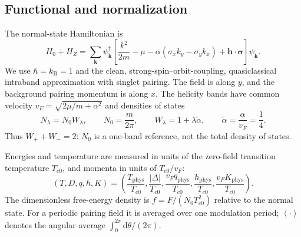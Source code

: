 \documentclass[11pt,a4paper]{article}
\newcommand{\dd}{\mathrm{d}}
\newcommand{\av}[1]{\left\langle #1\right\rangle}
\newcommand{\Tc}{T_{c0}}
\begin{document}
\subsection{Functional and normalization}
The normal-state Hamiltonian is
\begin{equation}\label{eq:hamiltonian}
 H_0+H_Z=\sum_{\bm k}\psi_{\bm k}^{\dagger}
 \left[\frac{k^2}{2m}-\mu-\alpha(\sigma_x k_y-\sigma_y k_x)
 +\bm h\cdot\bm\sigma\right]\psi_{\bm k}.
\end{equation}
We use $\hbar=k_{\mathrm B}=1$ and the clean, strong-spin--orbit-coupling, quasiclassical intraband approximation with singlet pairing. The field is along $y$, and the background pairing momentum is along $x$. The helicity bands have common velocity $v_F=\sqrt{2\mu/m+\alpha^2}$ and densities of states
\begin{equation}\label{eq:dos}
 N_\lambda=N_0W_\lambda,\qquad N_0=\frac{m}{2\pi},\qquad
 W_\lambda=1+\lambda\widetilde\alpha,\qquad \widetilde\alpha=\frac{\alpha}{v_F}=\frac14.
\end{equation}
Thus $W_++W_-=2$: $N_0$ is a one-band reference, not the total density of states.

Energies and temperature are measured in units of the zero-field transition temperature $\Tc$, and momenta in units of $\Tc/v_F$:
\begin{equation}\label{eq:units}
 (T,D,q,h,K)=\left(\frac{T_{\mathrm{phys}}}{\Tc},
 \frac{|\Delta|}{\Tc},\frac{v_Fq_{\mathrm{phys}}}{\Tc},
 \frac{h_{\mathrm{phys}}}{\Tc},\frac{v_FK_{\mathrm{phys}}}{\Tc}\right).
\end{equation}
The dimensionless free-energy density is $f=F/(N_0\Tc^2)$ relative to the normal state. For a periodic pairing field it is averaged over one modulation period; $\av{\cdot}$ denotes the angular average $\int_0^{2\pi}\dd\theta/(2\pi)$.
\end{document}
